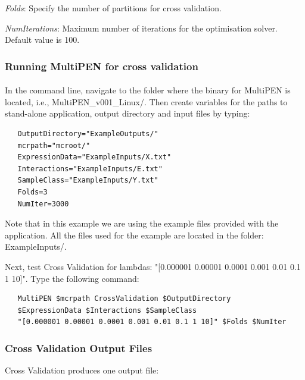 \documentclass[11pt, oneside]{article}   	%
\begin{document}
{\it Folds}: Specify the number of partitions for cross validation.

{\it NumIterations}: Maximum number of iterations for the optimisation solver. Default value is 100.





\subsubsection{Running MultiPEN for cross validation}
\paragraph{}


In the command line, navigate to the folder where the binary for MultiPEN is located, i.e., MultiPEN\_v001\_Linux/. Then create variables for the paths to stand-alone application, output directory and input files by typing:


\begin{framed}
\begin{verbatim}
   OutputDirectory="ExampleOutputs/"
   mcrpath="mcroot/"
   ExpressionData="ExampleInputs/X.txt"
   Interactions="ExampleInputs/E.txt"
   SampleClass="ExampleInputs/Y.txt"
   Folds=3
   NumIter=3000
\end{verbatim}
\end{framed}


Note that in this example we are using the example files provided with the application. All the files used for the example are located in the folder: ExampleInputs/.


Next, test Cross Validation for lambdas: "[0.000001 0.00001 0.0001 0.001 0.01 0.1 1 10]". Type the following command:


\begin{framed}
\begin{verbatim}
   MultiPEN $mcrpath CrossValidation $OutputDirectory 
   $ExpressionData $Interactions $SampleClass 
   "[0.000001 0.00001 0.0001 0.001 0.01 0.1 1 10]" $Folds $NumIter
\end{verbatim}
\end{framed}




\subsubsection{Cross Validation Output Files}


Cross Validation produces one output file:
\end{document}

